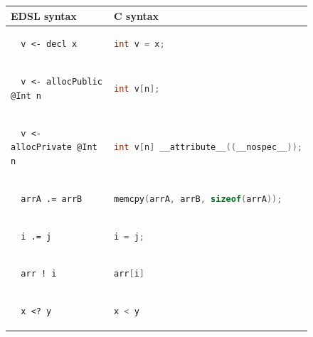 \documentclass[10pt, conference]{IEEEtran}
\begin{document}
\begin{figure}
\begin{tabular}{|l|l|}
  \hline
  EDSL syntax & C syntax \\
  \hline
  \begin{lstlisting}
  v <- decl x
  \end{lstlisting}
  & \begin{lstlisting}[language=C]
  int v = x;
  \end{lstlisting}\\

  \hline
  \begin{lstlisting}
  v <- allocPublic @Int n
  \end{lstlisting}
  & \begin{lstlisting}[language=C]
  int v[n];
  \end{lstlisting}\\

  \hline
  \begin{lstlisting}
  v <- allocPrivate @Int n
  \end{lstlisting}
  & \begin{lstlisting}[language=C]
  int v[n] __attribute__((__nospec__));
  \end{lstlisting}\\

  \hline
  \begin{lstlisting}
  arrA .= arrB
  \end{lstlisting}
  & \begin{lstlisting}[language=C]
  memcpy(arrA, arrB, sizeof(arrA));
  \end{lstlisting}\\

  \hline
  \begin{lstlisting}
  i .= j
  \end{lstlisting}
  & \begin{lstlisting}[language=C]
  i = j;
  \end{lstlisting}\\

  \hline
  \begin{lstlisting}
  arr ! i
  \end{lstlisting}
  & \begin{lstlisting}[language=C]
  arr[i]
  \end{lstlisting}\\

  \hline
  \begin{lstlisting}
  x <? y
  \end{lstlisting}
  & \begin{lstlisting}[language=C]
  x < y
  \end{lstlisting}\\


\end{tabular}
\end{figure}
\end{document}

